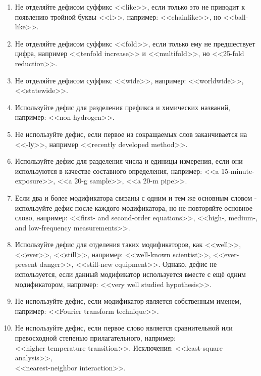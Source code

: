 \documentclass[a5paper, 10pt, twoside, numbers=enddot]{scrartcl}
\begin{document}
\begin{enumerate}
\begin{enumerate}
    \item Не отделяйте дефисом суффикс <<like>>, если только это не приводит к появлению тройной буквы <<l>>, например: <<chainlike>>, но <<ball-like>>.

    \item Не отделяйте дефисом суффикс <<fold>>, если только ему не предшествует цифра, например <<tenfold increase>> и <<multifold>>, но <<25-fold reduction>>.

    \item Не отделяйте дефисом суффикс <<wide>>, например: <<worldwide>>,\\ <<statewide>>.

    \item Используйте дефис для разделения префикса и химических названий, например: <<non-hydrogen>>.

    \item Не используйте дефис, если первое из сокращаемых слов заканчивается на <<-lу>>, например <<recently developed method>>.

    \item Используйте дефис для разделения числа и единицы измерения, если они используются в качестве составного определения, например: <<a 15-minute-exposure>>, <<a 20-g sample>>, <<a 20-m pipe>>.

    \item Если два и более модификатора связаны с одним и тем же основным словом - используйте дефис после каждого модификатора, но не повторяйте основное слово, например: <<first- and second-order equations>>, <<high-, medium-, and low-frequency measurements>>.

    \item Используйте дефис для отделения таких модификаторов, как <<well>>, <<ever>>, <<still>>, например: <<well-known scientist>>, <<ever-present danger>>, <<still-new equipment>>. Однако, дефис не используется, если данный модификатор  используется вместе с ещё одним модификатором, например: <<very well studied hypothesis>>.

    \item Не используйте дефис, если модификатор является собственным именем, например: <<Fourier transform technique>>.

    \item Не используйте дефис, если первое слово является сравнительной или превосходной степенью прилагательного, например:\\ <<higher temperature transition>>. Исключения: <<least-square analysis>>,\\ <<nearest-neighbor interaction>>.


\end{enumerate}
\end{enumerate}
\end{document}
